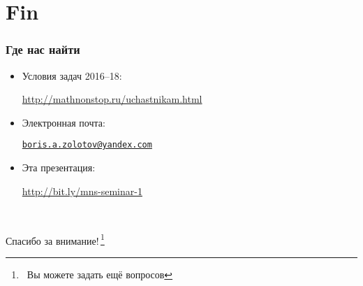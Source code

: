 \documentclass[aspectratio=1610,12pt]{beamer}
\def\fram#1#2{\begin{frame}\frametitle{\bf #1}#2\end{frame}}
\def\mitem{\medskip\item}
\def\mitem{\medskip\item}
\begin{document}
\section[Конец]{Fin}

\fram{Где нас найти}{
\begin{itemize}
	\item Условия задач 2016–18:
		\centerline{\url{http://mathnonstop.ru/uchastnikam.html}}
	\mitem Электронная почта:
		\centerline{\href{mailto:boris.a.zolotov@yandex.com}{\tt boris.a.zolotov@yandex.com}}
	\mitem Эта презентация:
		\centerline{\url{http://bit.ly/mns-seminar-1}}
\end{itemize}
}

\renewcommand{\thefootnote}{/*\!/}
\begin{frame}
	\ \\
	\centerline{\huge Спасибо за внимание!\,\footnote{\ Вы можете задать ещё вопросов}}
\end{frame}
\end{document}
